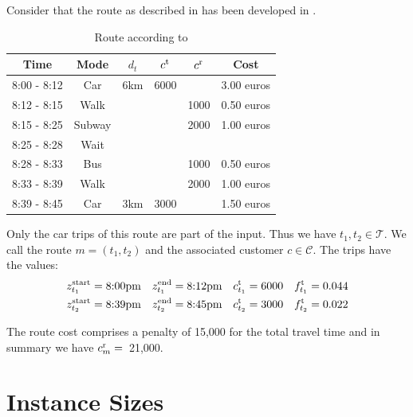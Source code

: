 \begin{example}
\label{ex:example_route}

Consider that the route as described in  has been developed in . 

\begin{table}[htb]
	\centering
	\begin{tabular}{cccccc}
		Time & Mode & $d_t$ & $c^{\operatorname{t}}$ & $c^{\operatorname{r}}$ & Cost \\
		\hline
		8:00 - 8:12 & Car & 6km & 6000 & & 3.00 euros \\
		8:12 - 8:15 & Walk & & & 1000 & 0.50 euros \\
		8:15 - 8:25	& Subway & & & 2000 & 1.00 euros \\
		8:25 - 8:28 & Wait & & & & \\
		8:28 - 8:33 & Bus & & & 1000 & 0.50 euros \\
		8:33 - 8:39 & Walk & & & 2000 & 1.00 euros \\
		8:39 - 8:45 & Car & 3km & 3000 & & 1.50 euros
	\end{tabular}
	\caption{Route according to }
	\label{tab:exemplary_route}
\end{table}

Only the car trips of this route are part of the input. Thus we have $t_1,t_2\in\mathcal{T}$. We call the route ${m=\left(t_1,t_2\right)}$ and the associated customer $c\in\mathcal{C}$. The trips have the values:
\begin{align*}
	z^{\operatorname{start}}_{t_1} = \text{8:00pm} && z^{\operatorname{end}}_{t_1} = \text{8:12pm} && c^{\operatorname{t}}_{t_1} = 6000 && f^{\operatorname{t}}_{t_1} = 0.044 \\
	z^{\operatorname{start}}_{t_2} = \text{8:39pm} && z^{\operatorname{end}}_{t_2} = \text{8:45pm} && c^{\operatorname{t}}_{t_2} = 3000 && f^{\operatorname{t}}_{t_2} = 0.022
\end{align*}

The route cost comprises a penalty of 15,000 for the total travel time and in summary we have ${c^{\operatorname{r}}_m =}$~21,000.

\end{example}

\section{Instance Sizes}

